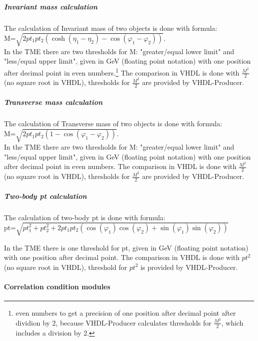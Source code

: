 \subparagraph{Invariant mass calculation}
\label{sec:gtl:inv_mass_calculation}

The calculation of Invariant mass of two objects is done with formula:\\
M=$\sqrt{2 pt_1  pt_2 (\cosh(\eta_1-\eta_2)-\cos(\varphi_1-\varphi_2))}$.\\
In the TME there are two thresholds for M: "greater/equal lower limit" and "less/equal upper limit", given in GeV (floating point notation)
with one position after decimal point in even numbers.\footnote{even numbers to get a precision of one position after decimal point after dividion by 2,
because VHDL-Producer calculates thresholds for $\frac{M^2}{2}$, which includes a division by 2.}
The comparison in VHDL is done with $\frac{M^2}{2}$ (no square root in VHDL), thresholds for $\frac{M^2}{2}$ are provided by VHDL-Producer.

\subparagraph{Transverse mass calculation}
\label{sec:gtl:transverse_mass_calculation}

The calculation of Transverse mass of two objects is done with formula:\\
M=$\sqrt{2 pt_1 pt_2 (1-\cos(\varphi_1-\varphi_2))}$.\\
In the TME there are two thresholds for M: "greater/equal lower limit" and "less/equal upper limit", given in GeV (floating point notation)
with one position after decimal point in even numbers.
The comparison in VHDL is done with $\frac{M^2}{2}$ (no square root in VHDL), thresholds for $\frac{M^2}{2}$ are provided by VHDL-Producer.

\subparagraph{Two-body pt calculation}
\label{sec:gtl:twobody_pt_calculation}

The calculation of two-body pt is done with formula:\\
pt=$\sqrt{pt^2_1 + pt^2_2 + 2  pt_1 pt_2 (\cos(\varphi_1) \cos(\varphi_2) + \sin(\varphi_1) \sin(\varphi_2))}$

In the TME there is one threshold for pt, given in GeV (floating point notation) with one position after decimal point.
The comparison in VHDL is done with ${pt^2}$ (no square root in VHDL), threshold for ${pt^2}$ is provided by VHDL-Producer.

\paragraph{Correlation condition modules}
\label{sec:gtl:correlation_condition_modules}

